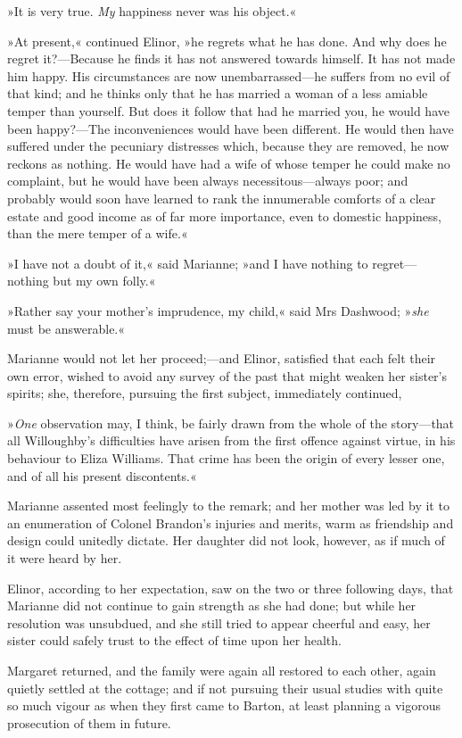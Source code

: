 »It is very true. \textit{My} happiness never was his object.«

»At present,« continued Elinor, »he regrets what he has done. And why does he regret it?—Because he finds it has not answered towards himself. It has not made him happy. His circumstances are now unembarrassed—he suffers from no evil of that kind; and he thinks only that he has married a woman of a less amiable temper than yourself. But does it follow that had he married you, he would have been happy?—The inconveniences would have been different. He would then have suffered under the pecuniary distresses which, because they are removed, he now reckons as nothing. He would have had a wife of whose temper he could make no complaint, but he would have been always necessitous—always poor; and probably would soon have learned to rank the innumerable comforts of a clear estate and good income as of far more importance, even to domestic happiness, than the mere temper of a wife.«

»I have not a doubt of it,« said Marianne; »and I have nothing to regret—nothing but my own folly.«

»Rather say your mother’s imprudence, my child,« said Mrs Dashwood; »\textit{she} must be answerable.«

Marianne would not let her proceed;—and Elinor, satisfied that each felt their own error, wished to avoid any survey of the past that might weaken her sister’s spirits; she, therefore, pursuing the first subject, immediately continued,

»\textit{One} observation may, I think, be fairly drawn from the whole of the story—that all Willoughby’s difficulties have arisen from the first offence against virtue, in his behaviour to Eliza Williams. That crime has been the origin of every lesser one, and of all his present discontents.«

Marianne assented most feelingly to the remark; and her mother was led by it to an enumeration of Colonel Brandon’s injuries and merits, warm as friendship and design could unitedly dictate. Her daughter did not look, however, as if much of it were heard by her.

Elinor, according to her expectation, saw on the two or three following days, that Marianne did not continue to gain strength as she had done; but while her resolution was unsubdued, and she still tried to appear cheerful and easy, her sister could safely trust to the effect of time upon her health.

Margaret returned, and the family were again all restored to each other, again quietly settled at the cottage; and if not pursuing their usual studies with quite so much vigour as when they first came to Barton, at least planning a vigorous prosecution of them in future.

